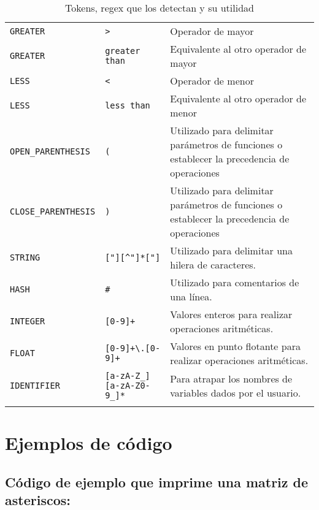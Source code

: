 \documentclass[titlepage]{article}
\begin{document}
\begin{longtable}{p{}p{}p{}}
            \texttt{GREATER} & \texttt{>} & Operador de mayor\\
            \texttt{GREATER} & \texttt{greater than} & Equivalente al otro operador de mayor \\
            \texttt{LESS} & \texttt{<} & Operador de menor \\
            \texttt{LESS} & \texttt{less than} & Equivalente al otro operador de menor \\
            \texttt{OPEN\_PARENTHESIS} & \texttt{(} & Utilizado para delimitar parámetros de funciones o establecer la precedencia de operaciones\\
            \texttt{CLOSE\_PARENTHESIS} & \texttt{)} & Utilizado para delimitar parámetros de funciones o establecer la precedencia de operaciones\\
            \texttt{STRING} & \texttt{["][\^{}"]*["]} & Utilizado para delimitar una hilera de caracteres. \\
            \texttt{HASH} & \texttt{\#} & Utilizado para comentarios de una línea. \\
            \texttt{INTEGER} & \texttt{[0-9]+} & Valores enteros para realizar operaciones aritméticas. \\
            \texttt{FLOAT} & \texttt{[0-9]+\textbackslash{}.[0-9]+} & Valores en punto flotante para realizar operaciones aritméticas. \\
            \texttt{IDENTIFIER} & \texttt{[a-zA-Z\_]} \texttt{[a-zA-Z0-9\_]*} & Para atrapar los nombres de variables dados por el usuario. \\
        \bottomrule
        \caption{Tokens, regex que los detectan y su utilidad}
    \end{longtable}
    \label{tab:my_label}



\section{Ejemplos de código}

\subsection{Código de ejemplo que imprime una matriz de asteriscos: }
\end{document}
